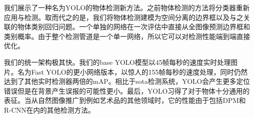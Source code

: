 \documentclass[../main.tex]{subfile}
\begin{document}
我们展示了一种名为YOLO的物体检测新方法。之前物体检测的方法将分类器重新应用与检测。取而代之的是，我们将物体检测建模为空间分离的边界框以及与之关联的物体类别回归问题。一个单独的网络在一次评估中直接从全图像预测边界框和类别概率。由于整个检测管道是一个单一网络，所以它可以对检测性能端到端直接优化。

我们的统一架构极其快。我们的base YOLO模型以45帧每秒的速度实时处理图片。名为Fast YOLO的更小网络版本，以惊人的155帧每秒的速度处理，同时仍然达到了其他实时检测器两倍的mAP。相比于sota检测系统，YOLO会产生更多定位错误但是在背景产生误报的可能性更小。最后，YOLO习得了对于物体十分通用的表征。当从自然图像推广到例如艺术品的其他领域时，它的性能由于包括DPM和R-CNN在内的其他检测方法。
\end{document}
